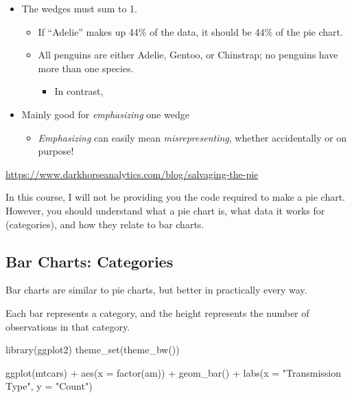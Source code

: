 \documentclass[
  letterpaper,
  DIV=11,
  numbers=noendperiod]{scrreprt}
\newenvironment{Shaded}{\begin{snugshade}}{\end{snugshade}}
\newcommand{\AttributeTok}[1]{\textcolor[rgb]{0.40,0.45,0.13}{#1}}
\newcommand{\FunctionTok}[1]{\textcolor[rgb]{0.28,0.35,0.67}{#1}}
\newcommand{\NormalTok}[1]{\textcolor[rgb]{0.00,0.23,0.31}{#1}}
\newcommand{\SpecialCharTok}[1]{\textcolor[rgb]{0.37,0.37,0.37}{#1}}
\newcommand{\StringTok}[1]{\textcolor[rgb]{0.13,0.47,0.30}{#1}}
\providecommand{\tightlist}{%
  \setlength{\itemsep}{0pt}\setlength{\parskip}{0pt}}\usepackage{longtable,booktabs,array}
\begin{document}
\begin{itemize}
\tightlist
\item
  The wedges must sum to 1.

  \begin{itemize}
  \tightlist
  \item
    If ``Adelie'' makes up 44\% of the data, it should be 44\% of the
    pie chart.
  \item
    All penguins are either Adelie, Gentoo, or Chinstrap; no penguins
    have more than one species.

    \begin{itemize}
    \tightlist
    \item
      In contrast,
    \end{itemize}
  \end{itemize}
\item
  Mainly good for \emph{emphasizing} one wedge

  \begin{itemize}
  \tightlist
  \item
    \emph{Emphasizing} can easily mean \emph{misrepresenting}, whether
    accidentally or on purpose!
  \end{itemize}
\end{itemize}

\url{https://www.darkhorseanalytics.com/blog/salvaging-the-pie}

In this course, I will not be providing you the code required to make a
pie chart. However, you should understand what a pie chart is, what data
it works for (categories), and how they relate to bar charts.

\hypertarget{bar-charts-categories}{%
\subsection{Bar Charts: Categories}\label{bar-charts-categories}}

Bar charts are similar to pie charts, but better in practically every
way.

Each bar represents a category, and the height represents the number of
observations in that category.

\begin{Shaded}
\begin{Highlighting}[]
\FunctionTok{library}\NormalTok{(ggplot2)}
\FunctionTok{theme\_set}\NormalTok{(}\FunctionTok{theme\_bw}\NormalTok{())}

\FunctionTok{ggplot}\NormalTok{(mtcars) }\SpecialCharTok{+}
    \FunctionTok{aes}\NormalTok{(}\AttributeTok{x =} \FunctionTok{factor}\NormalTok{(am)) }\SpecialCharTok{+}
    \FunctionTok{geom\_bar}\NormalTok{() }\SpecialCharTok{+}
    \FunctionTok{labs}\NormalTok{(}\AttributeTok{x =} \StringTok{"Transmission Type"}\NormalTok{,}
        \AttributeTok{y =} \StringTok{"Count"}\NormalTok{)}
\end{Highlighting}
\end{Shaded}
\end{document}
